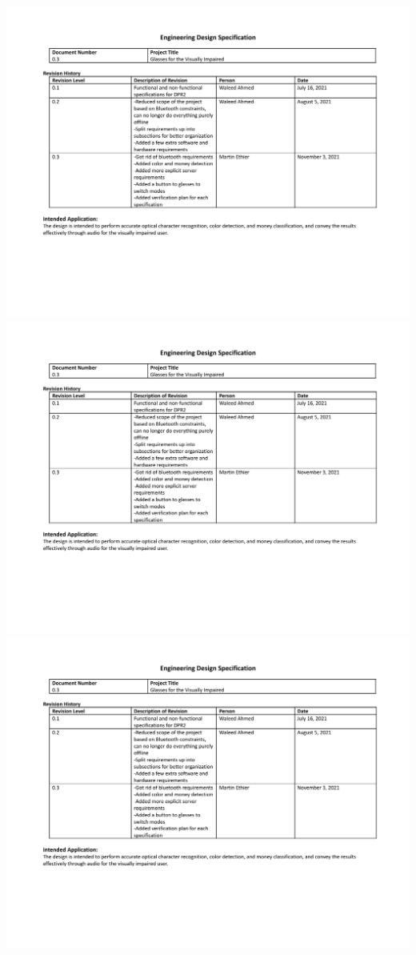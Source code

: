 \documentclass[a4paper,11pt]{article}
\begin{document}
\begin{landscape}
\begin{center}
        \includegraphics[page=3,width={0.86\linewidth}]{pdf/eds_0.3.pdf}
        \newpage
        \includegraphics[page=4,width={0.86\linewidth}]{pdf/eds_0.3.pdf}
        \newpage
        \includegraphics[page=5,width={0.86\linewidth}]{pdf/eds_0.3.pdf}
    \end{center}
    

\end{landscape}
\end{document}
